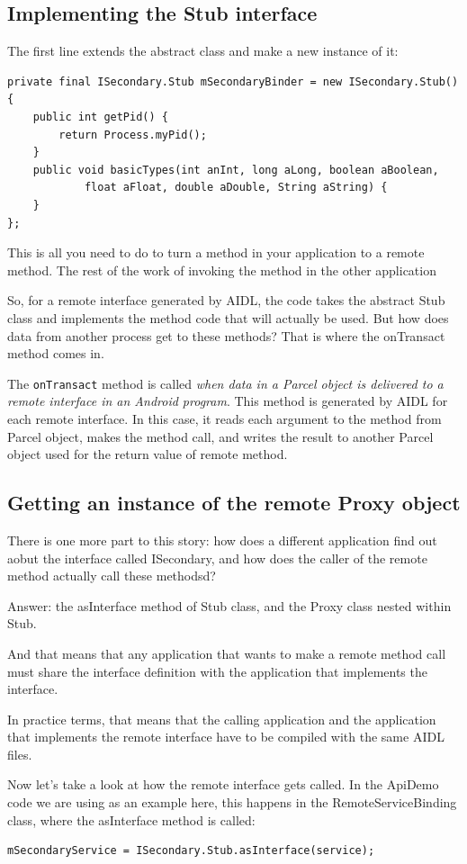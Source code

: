 \documentclass[11pt, a4paper]{book}
\begin{document}
\subsection{Implementing the Stub interface}
The first line extends the abstract class and make a new instance of it:
\begin{verbatim}
private final ISecondary.Stub mSecondaryBinder = new ISecondary.Stub() {
    public int getPid() {
        return Process.myPid();
    }
    public void basicTypes(int anInt, long aLong, boolean aBoolean,
            float aFloat, double aDouble, String aString) {
    }
};
\end{verbatim}
This is all you need to do to turn a method in your application to a remote
method. The rest of the work of invoking the method in the other application

So, for a remote interface generated by AIDL, the code takes the abstract Stub class and implements the method code that will actually be used. But how does data from another process get to these methods? That is where the onTransact method comes in.

The \verb|onTransact| method is called \emph{when data in a Parcel object is
delivered to a remote interface in an Android program}. This method is generated
by AIDL for each remote interface. In this case, it reads each argument to the
method from Parcel object, makes the method call, and writes the result to
another Parcel object used for the return value of remote method.
\subsection{Getting an instance of the remote Proxy object}
There is one more part to this story: how does a different application find out
aobut the interface called ISecondary, and how does the caller of the remote
method actually call these methodsd? 

Answer: the asInterface method of Stub class, and the Proxy class nested within
Stub.

And that means that any application that wants to make a remote method call must
share the interface definition with the application that implements the
interface.

In practice terms, that means that the calling application and the application
that implements the remote interface have to be compiled with the same AIDL
files.

Now let's take a look at how the remote interface gets called. In the ApiDemo
code we are using as an example here, this happens in the RemoteServiceBinding
class, where the asInterface method is called:
\begin{verbatim}
mSecondaryService = ISecondary.Stub.asInterface(service);
\end{verbatim}
\end{document}
